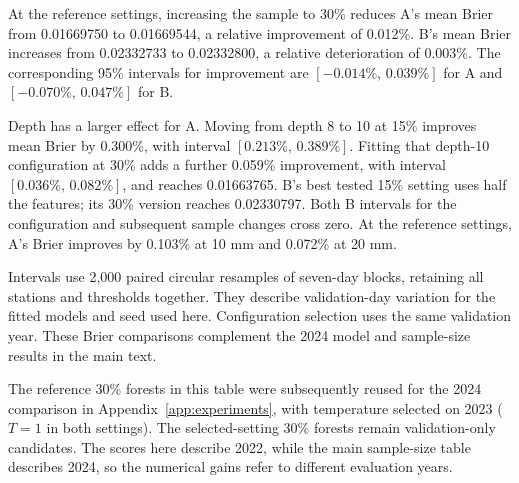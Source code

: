 At the reference settings, increasing the sample to 30\% reduces A's mean Brier from 0.01669750 to 0.01669544, a relative improvement of 0.012\%. B's mean Brier increases from 0.02332733 to 0.02332800, a relative deterioration of 0.003\%. The corresponding 95\% intervals for improvement are $[-0.014\%,\,0.039\%]$ for A and $[-0.070\%,\,0.047\%]$ for B.

Depth has a larger effect for A. Moving from depth 8 to 10 at 15\% improves mean Brier by 0.300\%, with interval $[0.213\%,\,0.389\%]$. Fitting that depth-10 configuration at 30\% adds a further 0.059\% improvement, with interval $[0.036\%,\,0.082\%]$, and reaches 0.01663765. B's best tested 15\% setting uses half the features; its 30\% version reaches 0.02330797. Both B intervals for the configuration and subsequent sample changes cross zero. At the reference settings, A's Brier improves by 0.103\% at 10 mm and 0.072\% at 20 mm.

Intervals use 2,000 paired circular resamples of seven-day blocks, retaining all stations and thresholds together. They describe validation-day variation for the fitted models and seed used here. Configuration selection uses the same validation year. These Brier comparisons complement the 2024 model and sample-size results in the main text.

The reference 30\% forests in this table were subsequently reused for the 2024 comparison in Appendix~\ref{app:experiments}, with temperature selected on 2023 ($T=1$ in both settings). The selected-setting 30\% forests remain validation-only candidates. The scores here describe 2022, while the main sample-size table describes 2024, so the numerical gains refer to different evaluation years.
